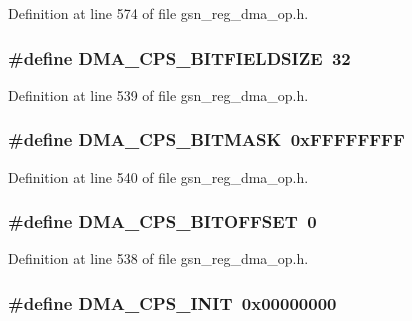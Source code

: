 Definition at line 574 of file gsn\_\-reg\_\-dma\_\-op.h.

\hypertarget{a00547_a1da186b1b23199c9bc3486e9f504873a}{
\subsubsection[{DMA\_\-CPS\_\-BITFIELDSIZE}]{\setlength{\rightskip}{0pt plus 5cm}\#define DMA\_\-CPS\_\-BITFIELDSIZE~32}}
\label{a00547_a1da186b1b23199c9bc3486e9f504873a}


Definition at line 539 of file gsn\_\-reg\_\-dma\_\-op.h.

\hypertarget{a00547_ae0ab8709a990ea2cf47cd89689992122}{
\subsubsection[{DMA\_\-CPS\_\-BITMASK}]{\setlength{\rightskip}{0pt plus 5cm}\#define DMA\_\-CPS\_\-BITMASK~0xFFFFFFFF}}
\label{a00547_ae0ab8709a990ea2cf47cd89689992122}


Definition at line 540 of file gsn\_\-reg\_\-dma\_\-op.h.

\hypertarget{a00547_aad96f845b4d5d72bbf83b09a3b0dfffb}{
\subsubsection[{DMA\_\-CPS\_\-BITOFFSET}]{\setlength{\rightskip}{0pt plus 5cm}\#define DMA\_\-CPS\_\-BITOFFSET~0}}
\label{a00547_aad96f845b4d5d72bbf83b09a3b0dfffb}


Definition at line 538 of file gsn\_\-reg\_\-dma\_\-op.h.

\hypertarget{a00547_aa8ddbb7e180bae2401c41b3996bb01a6}{
\subsubsection[{DMA\_\-CPS\_\-INIT}]{\setlength{\rightskip}{0pt plus 5cm}\#define DMA\_\-CPS\_\-INIT~0x00000000}}
\label{a00547_aa8ddbb7e180bae2401c41b3996bb01a6}



